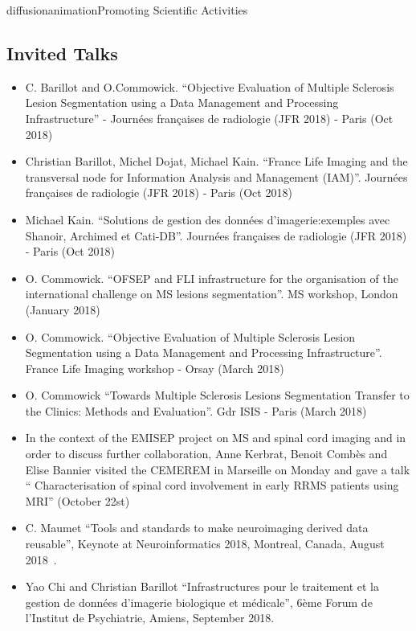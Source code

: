 \documentclass{ra2018}
\begin{document}
\begin{module}{diffusion}{animation}{Promoting Scientific Activities}
\subsection{Invited Talks}
\begin{itemize}
    \item C. Barillot and O.Commowick. ``Objective Evaluation of Multiple Sclerosis Lesion Segmentation using a Data Management and Processing Infrastructure'' - Journées françaises de radiologie (JFR 2018) - Paris (Oct 2018)~\cite{commowick:inserm-01895603}
    \item Christian Barillot, Michel Dojat, Michael Kain. ``France Life Imaging and the transversal node for Information Analysis and Management (IAM)''. Journées françaises de radiologie (JFR 2018) - Paris (Oct 2018)~\cite{barillot:inserm-01895605}
    \item Michael Kain. ``Solutions de gestion des données d’imagerie:exemples avec Shanoir, Archimed et Cati-DB''. Journées françaises de radiologie (JFR 2018) - Paris (Oct 2018)~\cite{kain:inserm-01895596}
    \item O. Commowick. ``OFSEP and FLI infrastructure for the organisation of the international challenge on MS lesions segmentation''. MS workshop, London (January 2018)
    \item O. Commowick. ``Objective Evaluation of Multiple Sclerosis Lesion Segmentation using a Data Management and Processing Infrastructure''. France Life Imaging workshop - Orsay (March 2018)
    \item O. Commowick ``Towards Multiple Sclerosis Lesions Segmentation Transfer to the Clinics: Methods and Evaluation''. Gdr ISIS - Paris (March 2018)
    \item In the context of the EMISEP project on MS and spinal cord imaging and in order to discuss further collaboration, Anne Kerbrat, Benoit Combès and Elise Bannier visited the CEMEREM in Marseille on Monday and gave a talk `` Characterisation of spinal cord involvement in early RRMS patients using MRI'' (October 22st)
    \item C. Maumet ``Tools and standards to make neuroimaging derived data reusable'', Keynote at Neuroinformatics 2018, Montreal, Canada, August 2018~\cite{maumet:inserm-01886089}.
    \item Yao Chi and Christian Barillot ``Infrastructures pour le traitement et la gestion de données d'imagerie biologique et médicale'', 6ème Forum de l'Institut de Psychiatrie, Amiens, September 2018.
\end{itemize}



\end{module}
\end{document}
